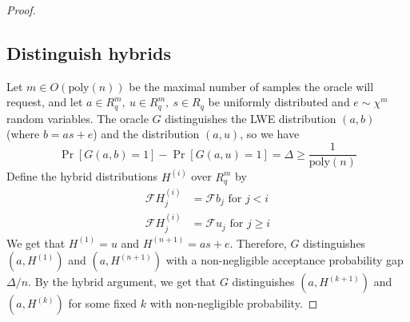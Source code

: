 \begin{proof}
\subsection{Distinguish hybrids}
Let $m \in O(\mathrm{poly}(n))$ be the maximal number of samples the oracle will request, and let $a \in R_q^m,\ u \in R_q^m,\ s \in R_q$ be uniformly distributed and $e \sim \chi^m$ random variables. The oracle $G$ distinguishes the LWE distribution $(a, b)$ (where $b = a s + e$) and the distribution $(a, u)$, so we have 
\begin{equation}
\Pr[G(a, b) = 1] - \Pr[G(a, u) = 1] = \Delta \geq \frac 1 {\mathrm{poly}(n)} \nonumber
\end{equation}
Define the hybrid distributions $H^{(i)}$ over $R_q^m$ by
\begin{equation}
\begin{split}
\mathcal{F}H^{(i)}_j &= \mathcal{F}b_j \text{ for } j < i\\
\mathcal{F}H^{(i)}_j &= \mathcal{F}u_j \text{ for } j \geq i
\end{split}\nonumber
\end{equation}
We get that $H^{(1)} = u$ and $H^{(n + 1)} = as + e$. Therefore, $G$ distinguishes $(a, H^{(1)})$ and $(a, H^{(n + 1)})$ with a non-negligible acceptance probability gap $\Delta / n$. By the hybrid argument, we get that $G$ distinguishes $(a, H^{(k + 1)})$ and $(a, H^{(k)})$ for some fixed $k$ with non-negligible probability.


\end{proof}

